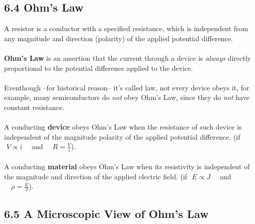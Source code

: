 \documentclass[12pt, a4paper]{article}
\begin{document}
		
		
		
		\subsection*{6.4 Ohm's Law}
		
		A resistor is a conductor with a specified resistance, which is independent from any magnitude and direction (polarity) of the applied potential difference. \\ \\
		\textbf{Ohm's Law} is an assertion that the current through a device is \textit{always} directly proportional to the potential difference applied to the device. \\ \\
		Eventhough --for historical reason-- it's called law, not every device obeys it, for example, many semiconductors do \textit{not} obey Ohm's Law, since they do \textit{not} have constant resistance. \\\\
		A conducting \textbf{device} obeys Ohm's Law when the resistance of such device is independent of the magnitude polarity of the applied potential difference. 
		(if $\, \, V \propto i \quad$ and $\quad R = \frac{V}{i}$). \\ \\
		A conducting \textbf{material} obeys Ohm's Law when its resistivity is independent of the magnitude and direction of the applied electric field. (if $\, \, E \propto J \quad$ and $\quad \rho = \frac{E}{J}$).
		
		
		
		\subsection*{6.5 A Microscopic View of Ohm's Law}
		
\end{document}
